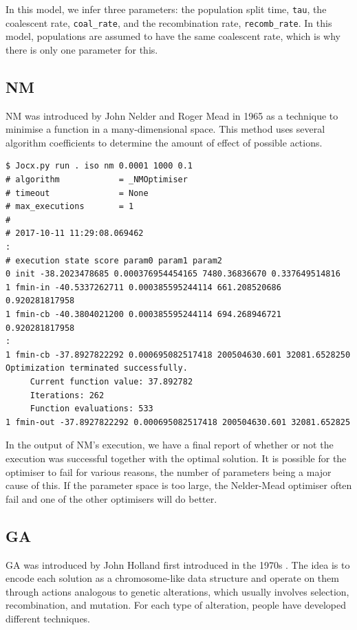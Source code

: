 \documentclass[graybox]{svmult}
\begin{document}
In this model, we infer three parameters: the population split time, \texttt{tau}, the coalescent rate, \texttt{coal\_rate}, and the recombination rate, \texttt{recomb\_rate}. In this model, populations are assumed to have the same coalescent rate, which is why there is only one parameter for this.

\subsection{NM}

NM was introduced by John Nelder and Roger Mead in 1965 \cite{nelder1965simplex} as a technique to minimise a function in a many-dimensional space. This method uses several algorithm coefficients to determine the amount of effect of possible actions.

 {\scriptsize{}\begin{verbatim}
$ Jocx.py run . iso nm 0.0001 1000 0.1
# algorithm            = _NMOptimiser
# timeout              = None
# max_executions       = 1
#
# 2017-10-11 11:29:08.069462
:
# execution state score param0 param1 param2
0 init -38.2023478685 0.000376954454165 7480.36836670 0.337649514816
1 fmin-in -40.5337262711 0.000385595244114 661.208520686 0.920281817958
1 fmin-cb -40.3804021200 0.000385595244114 694.268946721 0.920281817958
:
1 fmin-cb -37.8927822292 0.000695082517418 200504630.601 32081.6528250
Optimization terminated successfully.
     Current function value: 37.892782
     Iterations: 262
     Function evaluations: 533
1 fmin-out -37.8927822292 0.000695082517418 200504630.601 32081.652825
\end{verbatim}}

In the output of NM's execution, we have a final report of whether or not the execution was successful together with the optimal solution. It is possible for the optimiser to fail for various reasons, the number of parameters being a major cause of this. If the parameter space is too large, the Nelder-Mead optimiser often fail and one of the other optimisers will do better.

\subsection{GA}

GA was introduced by John Holland first introduced in the 1970s \cite{holland1992genetic}. The idea is to encode each solution as a chromosome-like data structure and operate on them through actions analogous to genetic alterations, which usually involves selection, recombination, and mutation. For each type of alteration, people have developed different techniques.
\end{document}
